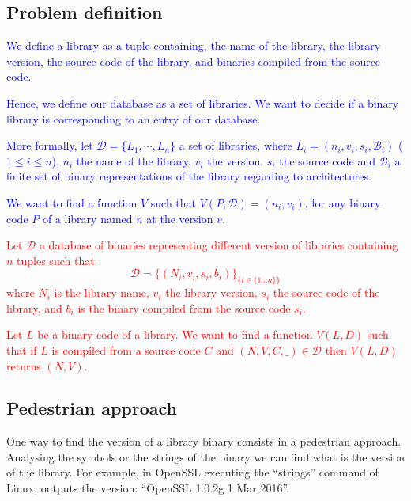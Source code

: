 \documentclass{article}
\newcommand{\ludo}[1]{\textcolor{blue}{#1}}
\newcommand{\thom}[1]{\textcolor{red}{#1}}
\begin{document}
   \subsection{Problem definition}

   \ludo{We define a library as a tuple containing, the name of the
   library, the library version, the source code of the library, and binaries
   compiled from the source code.}

   \ludo{Hence, we define our database as a set of libraries. We want to decide if a
   binary library is corresponding to an entry of our database.}

   \ludo{More formally, let $\mathcal{D} = \{ L_1, \cdots, L_n\}$ a set of libraries, where
   $L_i = (n_i, v_i, s_i, \mathcal{B}_i)$ ($1 \le i \le n$), $n_i$ the name of the library,
   $v_i$ the version, $s_i$ the source code and $\mathcal{B}_i$ a finite set of
   binary representations of the library regarding to architectures.}

   \ludo{We want to find a function $V$ such that $V(P,\mathcal{D}) = (n_i,
   v_i)$, for any binary code $P$ of a library named $n$ at the version $v$. }
   
   \thom{Let $\mathcal{D}$ a database of binaries representing different version of libraries containing $n$ tuples such that:
    \[ \mathcal{D} = \{ (N_i, v_i, s_i, b_i) \}_{\{i \in \{1 \dots n\}\}}  \]
    where $N_i$ is the library name, $v_i$ the library version, $s_i$ the source
    code of the library, and $b_i$ is the binary compiled from the source code
    $s_i$.}

    \thom{Let $L$ be a binary code of a library. We want to find a function
    $V(L,D)$ such that if $L$ is compiled from a source code $C$ and $(N, V,
    C, \_) \in \mathcal{D}$ then $V(L,D)$ returns $(N,V)$.}

	\subsection{Pedestrian approach}
    
        One way to find the version of a library binary consists in a
        pedestrian approach. 
        Analysing the symbols or the strings of the binary we can find what is
        the version of the library. For example, in OpenSSL executing the
        ``strings'' command of Linux, outputs the version: ``OpenSSL 1.0.2g  1
        Mar 2016''. 
\end{document}
